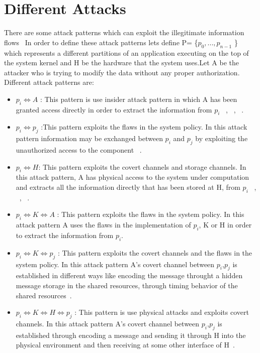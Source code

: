  \section{Different Attacks}
There are some attack patterns which can exploit the illegitimate information
flows~\cite{DBLP:attacks}
In order to define these attack patterns lets define P= \{$p_{0},...,p_{n-1} $ \} which represents a 
different partitions of an  application executing on the top of the
system kernel and H be the hardware that the system uses.Let A be the
attacker who is trying to modify the data without any proper 
authorization.
Different attack patterns are:
\begin{itemize}
 \item $p_{i}\Longleftrightarrow A$ :
 This pattern is use insider attack pattern in which A has been granted access directly in order
 to extract the information from $p_{i}$ ~\cite{Baracaldo:attack}, ~\cite{DBLP:attacks},
 ~\cite{Yu:attack}.
 
 \item $p_{i}\Longleftrightarrow p_{j}$ :This pattern exploits
 the flaws in the system policy. In this attack pattern information may
 be exchanged between $p_{i}$ and $p_{j}$ by exploiting the unauthorized
 access to the component ~\cite{Lampson:attack2}.
 
 \item $p_{i}\Longleftrightarrow H $:
 This pattern exploits the covert channels and storage channels.
 In this attack pattern, A has physical access to the system under
 computation and extracts all the information directly that
 has been stored at H, from $p_{i}$  ~\cite{Backes:attack1}, ~\cite{Halevi:attack1}, ~\cite{vanEck:attack1}.
 
 \item $p_{i}\Longleftrightarrow K \Longleftrightarrow A$ :
 This pattern exploits the flaws in the system policy.
 In this attack pattern A uses the flaws in the implementation of
 $p_{i}$, K or H in order to extract the information from $p_{i}$.
 
 \item $p_{i}\Longleftrightarrow K \Longleftrightarrow p_{j}$ :
 This pattern exploits the covert channels and the flaws in the 
 system policy. In this attack pattern A's covert channel between
 $p_{i}$,$p_{j}$ is established in different ways like encoding the
 message throught a hidden message storage in the shared resources, 
 through timing behavior of the shared resources~\cite{Lampson:attack2}.
 
 \item $p_{i}\Longleftrightarrow K \Longleftrightarrow H \Longleftrightarrow p_{j}$ :
 This pattern is use physical attacks and exploits covert channels.
In this attack pattern A's covert channel between
 $p_{i}$,$p_{j}$ is established through encoding a message and 
 sending 
 it through H into the physical environment and then receiving at some other
 interface of H~\cite{Klein:attack3,Robinson:attack3}.

\end{itemize}



